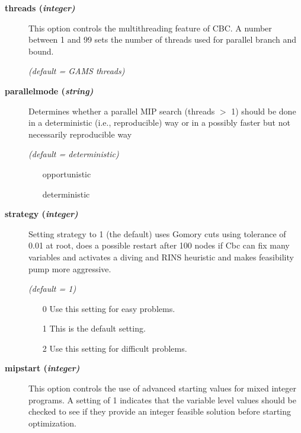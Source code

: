 \begin{description}

\item[\label{threads}\hypertarget{threads}
{\textbf{threads (\slshape{integer})}}]\hspace{1.0in}

This option controls the multithreading feature of CBC.
A number between 1 and 99 sets the number of threads used for parallel branch and bound.

\textsl{(default = GAMS threads)}

\item[\label{parallelmode}\hypertarget{parallelmode}
{\textbf{parallelmode (\slshape{string})}}]\hspace{1.0in}

Determines whether a parallel MIP search (threads $>$ 1) should be done in a deterministic (i.e., reproducible) way
or in a possibly faster but not necessarily reproducible way

\textsl{(default = deterministic)}
\begin{itemize}
\item[opportunistic]
\item[deterministic]
\end{itemize}

\item[\label{strategy}\hypertarget{strategy}
{\textbf{strategy (\slshape{integer})}}]\hspace{1.0in}

Setting strategy to 1 (the default) uses Gomory cuts using tolerance of 0.01 at root,
does a possible restart after 100 nodes if Cbc can fix many variables and activates
a diving and RINS heuristic and makes feasibility pump more aggressive.

\textsl{(default = 1)}
\begin{itemize}
\item[0] 
Use this setting for easy problems.
\item[1] 
This is the default setting.
\item[2]
Use this setting for difficult problems.
\end{itemize}

\item[\label{mipstart}\hypertarget{mipstart}
{\textbf{mipstart (\slshape{integer})}}]\hspace{1.0in}

This option controls the use of advanced starting values for mixed integer programs.
A setting of 1 indicates that the variable level values should be checked to see if they provide an integer feasible solution before starting optimization.


\end{description}
